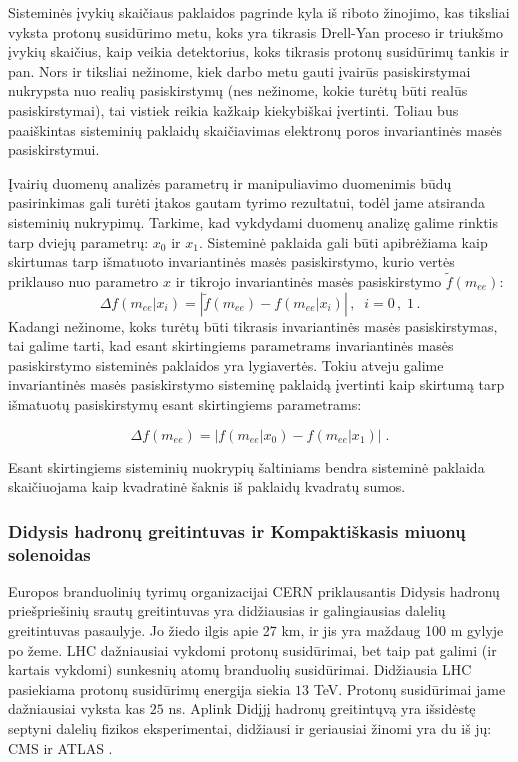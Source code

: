 \documentclass[a4paper, 12pt]{article}
\newlength\q
\begin{document}
Sisteminės įvykių skaičiaus paklaidos pagrinde kyla iš riboto žinojimo, kas tiksliai vyksta protonų susidūrimo metu, koks yra tikrasis Drell-Yan proceso ir triukšmo įvykių skaičius, kaip veikia detektorius, koks tikrasis protonų susidūrimų tankis ir pan. Nors ir tiksliai nežinome, kiek darbo metu gauti įvairūs pasiskirstymai nukrypsta nuo realių pasiskirstymų (nes nežinome, kokie turėtų būti realūs pasiskirstymai), tai vistiek reikia kažkaip kiekybiškai įvertinti. Toliau bus paaiškintas sisteminių paklaidų skaičiavimas elektronų poros invariantinės masės pasiskirstymui. 

Įvairių duomenų analizės parametrų ir manipuliavimo duomenimis būdų pasirinkimas gali turėti įtakos gautam tyrimo rezultatui, todėl jame atsiranda sisteminių nukrypimų. Tarkime, kad vykdydami duomenų analizę galime rinktis tarp dviejų parametrų: $x_{0}$ ir $x_{1}$. Sisteminė paklaida gali būti apibrėžiama kaip skirtumas tarp išmatuoto invariantinės masės pasiskirstymo, kurio vertės priklauso nuo parametro $x$ ir tikrojo invariantinės masės pasiskirstymo $\widetilde{f}(m_{ee})$:
\begin{equation}
\Delta f \left( m_{ee} | x_{i} \right) = \left| \widetilde{f} \left( m_{ee} \right) -
f \left( m_{ee} | x_{i} \right) \right| \, \mathrm{,} \; \; i=0\, , \; 1 \, .
\label{eq:systUncReal}
\end{equation}
Kadangi nežinome, koks turėtų būti tikrasis invariantinės masės pasiskirstymas, tai galime tarti, kad esant skirtingiems parametrams invariantinės masės pasiskirstymo sisteminės paklaidos yra lygiavertės. Tokiu atveju galime invariantinės masės pasiskirstymo sisteminę paklaidą įvertinti kaip skirtumą tarp išmatuotų pasiskirstymų esant skirtingiems parametrams:

\begin{equation}
\Delta f \left( m_{ee} \right) = \left| f \left( m_{ee} | x_{0} \right) - f \left( m_{ee} | x_{1} \right) \right| \; .
\label{eq:SystUncFinal}
\end{equation}

Esant skirtingiems sisteminių nuokrypių šaltiniams bendra sisteminė paklaida skaičiuojama kaip kvadratinė šaknis iš paklaidų kvadratų sumos.

\vspace{-0.3cm}
\subsubsection{Didysis hadronų greitintuvas ir Kompaktiškasis miuonų solenoidas}
Europos branduolinių tyrimų organizacijai CERN priklausantis Didysis hadronų priešpriešinių srautų greitintuvas yra didžiausias ir galingiausias dalelių greitintuvas pasaulyje. Jo žiedo ilgis apie 27 km, ir jis yra maždaug 100 m gylyje po žeme. LHC dažniausiai vykdomi protonų susidūrimai, bet taip pat galimi (ir kartais vykdomi) sunkesnių atomų branduolių susidūrimai. Didžiausia LHC pasiekiama protonų susidūrimų energija siekia $13$ TeV. Protonų susidūrimai jame dažniausiai vyksta kas $25$ ns. Aplink Didįjį hadronų greitintųvą yra išsidėstę septyni dalelių fizikos eksperimentai, didžiausi ir geriausiai žinomi yra du iš jų: CMS ir ATLAS \cite{LHCexperiments}.
\end{document}
